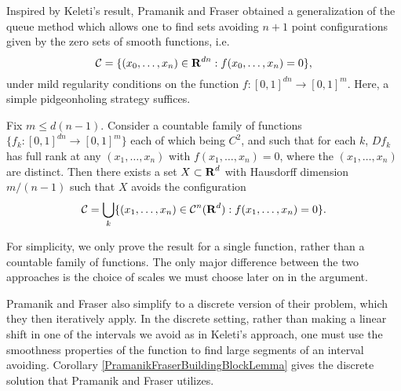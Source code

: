 Inspired by Keleti's result, Pramanik and Fraser obtained a generalization of the queue method which allows one to find sets avoiding $n+1$ point configurations given by the zero sets of smooth functions, i.e.
%
\[ \operatorname{\mathcal{C}} = \{ (x_0, \dots, x_n) \in \operatorname{\mathbf{R}}^{dn} : f(x_0, \dots, x_n) = 0 \}, \]
%
under mild regularity conditions on the function $f: [0,1]^{dn} \to [0,1]^m$. Here, a simple pidgeonholing strategy suffices.

\begin{theorem}
    Fix $m \leq d(n-1)$. Consider a countable family of functions $\{ f_k : [0,1]^{dn} \to [0,1]^m \}$ each of which being $C^2$, and such that for each $k$, $Df_k$ has full rank at any $(x_1, \dots, x_n)$ with $f(x_1, \dots, x_n) = 0$, where the $(x_1, \dots, x_n)$ are distinct. Then there exists a set $X \subset \operatorname{\mathbf{R}}^d$ with Hausdorff dimension $m/(n-1)$ such that $X$ avoids the configuration
    \[ \operatorname{\mathcal{C}} = \bigcup_k \{ (x_1, \dots, x_n) \in \operatorname{\mathcal{C}}^n(\operatorname{\mathbf{R}}^d): f(x_1, \dots, x_n) = 0 \}. \]
\end{theorem}

\begin{remark}
    For simplicity, we only prove the result for a single function, rather than a countable family of functions. The only major difference between the two approaches is the choice of scales we must choose later on in the argument.
\end{remark}

Pramanik and Fraser also simplify to a discrete version of their problem, which they then iteratively apply. In the discrete setting, rather than making a linear shift in one of the intervals we avoid as in Keleti's approach, one must use the smoothness properties of the function to find large segments of an interval avoiding. Corollary \ref{PramanikFraserBuildingBlockLemma} gives the discrete solution that Pramanik and Fraser utilizes.

